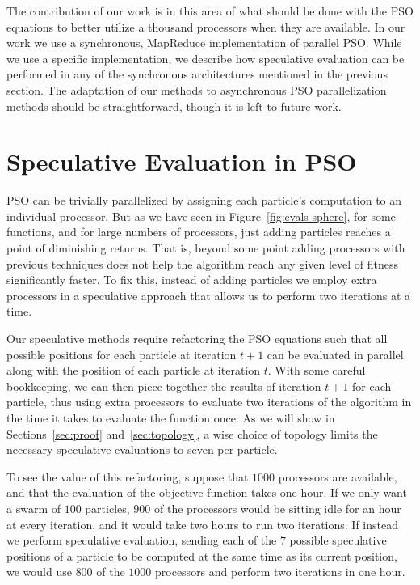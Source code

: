 \documentclass[smallcondensed]{svjour3}
\newcommand{\fig}[1]{Figure~\ref{fig:#1}}
\begin{document}
The contribution of our work is in this area of what should be done with the
PSO equations to better utilize a thousand processors when they are available.
In our work we use a synchronous, MapReduce implementation of parallel PSO.
While we use a specific implementation, we describe how speculative evaluation
can be performed in any of the synchronous architectures mentioned in the
previous section.  The adaptation of our methods to asynchronous PSO
parallelization methods should be straightforward, though it is left to future
work.

\section{Speculative Evaluation in PSO}
\label{sec:sepso}

PSO can be trivially parallelized by assigning each particle's computation to
an individual processor.  But as we have seen in \fig{evals-sphere}, for some
functions, and for large numbers of processors, just adding particles reaches a
point of diminishing returns.  That is, beyond some point adding processors
with previous techniques does not help the algorithm reach any given level of
fitness significantly faster.  To fix this, instead of adding particles we
employ extra processors in a speculative approach that allows us to perform two
iterations at a time.

Our speculative methods require refactoring the PSO equations such that all
possible positions for each particle at iteration $t+1$ can be evaluated in
parallel along with the position of each particle at iteration $t$.  With some
careful bookkeeping, we can then piece together the results of iteration $t+1$
for each particle, thus using extra processors to evaluate two iterations of
the algorithm in the time it takes to evaluate the function once.  As we will
show in Sections~\ref{sec:proof} and~\ref{sec:topology}, a wise choice of
topology limits the necessary speculative evaluations to seven per particle.

To see the value of this refactoring, suppose that $1000$ processors are
available, and that the evaluation of the objective function takes one hour.
If we only want a swarm of $100$ particles, $900$ of the processors would be
sitting idle for an hour at every iteration, and it would take two hours to run
two iterations.  If instead we perform speculative evaluation, sending each of
the $7$ possible speculative positions of a particle to be computed at the same
time as its current position, we would use $800$ of the $1000$ processors and
perform two iterations in one hour.
\end{document}
